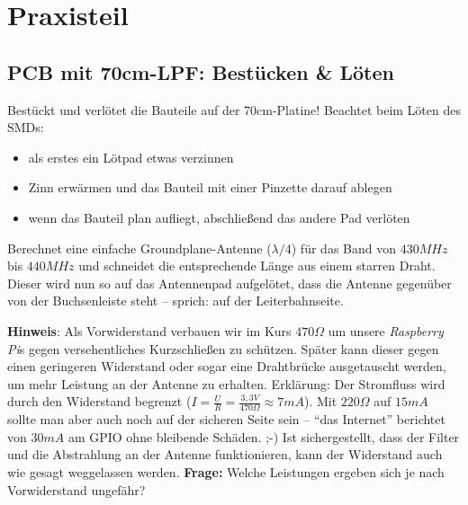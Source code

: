\section*{Praxisteil}

\subsection*{PCB mit 70cm-LPF: Bestücken \& Löten}

Bestückt und verlötet die Bauteile auf der 70cm-Platine! Beachtet beim Löten des SMDs:

\begin{itemize}
    \item als erstes ein Lötpad etwas verzinnen
    \item Zinn erwärmen und das Bauteil mit einer Pinzette darauf ablegen
    \item wenn das Bauteil plan aufliegt, abschließend das andere Pad verlöten
\end{itemize}

Berechnet eine einfache Groundplane-Antenne ($\lambda/4$) für das Band von $430
MHz$ bis $440 MHz$ und schneidet die entsprechende Länge aus einem starren
Draht. Dieser wird nun so auf das Antennenpad aufgelötet, dass die Antenne
gegenüber von der Buchsenleiste steht -- sprich: auf der Leiterbahnseite.

\textbf{Hinweis}: Als Vorwiderstand verbauen wir im Kurs $470 \Omega$ um unsere
\emph{Raspberry Pi}s gegen versehentliches Kurzschließen zu schützen. Später kann dieser
gegen einen geringeren Widerstand oder sogar eine Drahtbrücke ausgetauscht
werden, um mehr Leistung an der Antenne zu erhalten. Erklärung: Der Stromfluss
wird durch den Widerstand begrenzt ($I = \frac{U}{R} = \frac{3,3 V}{470 \Omega}
\approx 7 mA$). Mit $220 \Omega$ auf $15 mA$ sollte man aber auch noch auf der
sicheren Seite sein -- "`das Internet"' berichtet von $30 mA$ am GPIO ohne
bleibende Schäden. ;-) Ist sichergestellt, dass der Filter und die Abstrahlung
an der Antenne funktionieren, kann der Widerstand auch wie gesagt weggelassen
werden. \textbf{Frage:} Welche Leistungen ergeben sich je nach Vorwiderstand
ungefähr?


